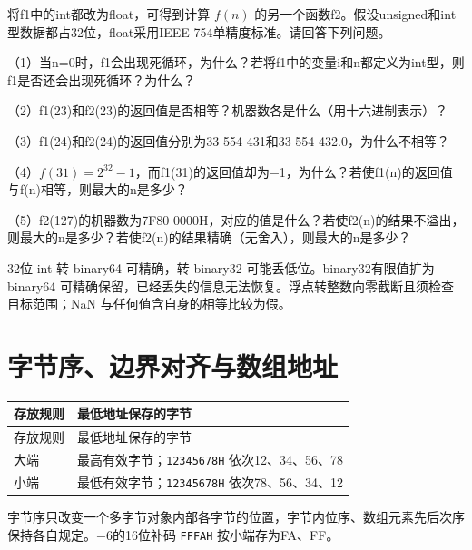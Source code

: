 将f1中的int都改为float，可得到计算 \(f(n)\) 的另一个函数f2。假设unsigned和int型数据都占32位，float采用IEEE 754单精度标准。请回答下列问题。

（1）当n=0时，f1会出现死循环，为什么？若将f1中的变量i和n都定义为int型，则f1是否还会出现死循环？为什么？

（2）f1(23)和f2(23)的返回值是否相等？机器数各是什么（用十六进制表示）？

（3）f1(24)和f2(24)的返回值分别为33 554 431和33 554 432.0，为什么不相等？

（4）\(f(31)=2^{32}-1\)，而f1(31)的返回值却为\ensuremath{-}1，为什么？若使f1(n)的返回值与f(n)相等，则最大的n是多少？

（5）f2(127)的机器数为7F80 0000H，对应的值是什么？若使f2(n)的结果不溢出，则最大的n是多少？若使f2(n)的结果精确（无舍入），则最大的n是多少？

32位 int 转 binary64 可精确，转 binary32 可能丢低位。binary32有限值扩为 binary64 可精确保留，已经丢失的信息无法恢复。浮点转整数向零截断且须检查目标范围；NaN 与任何值含自身的相等比较为假。

\section{字节序、边界对齐与数组地址}\label{CO02-storage}

\par\smallskip
{\fontsize{9.3}{12}\selectfont\setlength{\tabcolsep}{2.5pt}\setlength{\LTleft}{0pt}\setlength{\LTright}{0pt}
\begin{longtable}{@{}>{\raggedright\arraybackslash}p{}>{\raggedright\arraybackslash}p{}@{}}
\toprule
存放规则 & 最低地址保存的字节 \\

\midrule\endfirsthead\toprule
存放规则 & 最低地址保存的字节 \\

\midrule\endhead\bottomrule\endfoot
大端 & 最高有效字节；\texttt{12345678H} 依次12、34、56、78 \\

小端 & 最低有效字节；\texttt{12345678H} 依次78、56、34、12 \\

\end{longtable}}
\par\smallskip

字节序只改变一个多字节对象内部各字节的位置，字节内位序、数组元素先后次序保持各自规定。\ensuremath{-}6的16位补码 \texttt{FFFAH} 按小端存为FA、FF。

